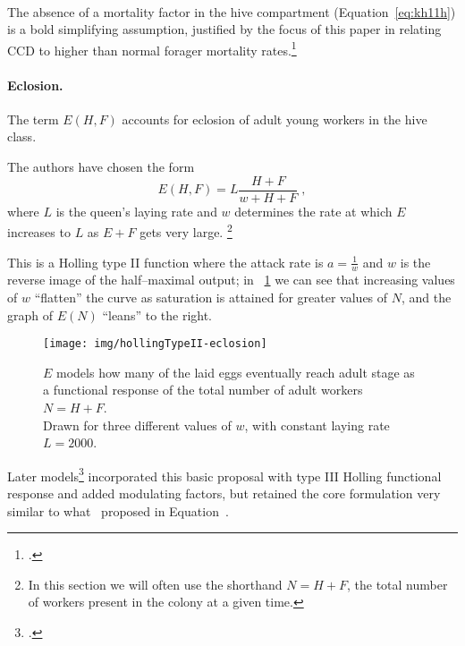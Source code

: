 \paragraph{}
The absence of a mortality factor in the hive compartment (Equation~\eqref{eq:kh11h}) is a bold simplifying assumption,
justified by the focus of this paper in relating CCD to higher than normal forager mortality rates.\footcite[1,2,3,5]{khoury2011}


\paragraph{Eclosion.}
The term $E(H,F)$ accounts for eclosion of adult young workers in the hive class.

The authors have chosen the form
\begin{equation}
    \label{eq:eclos}
    E(H,F) = L \frac{H+F}{w + H + F} \; ,
\end{equation}
where $L$ is the queen's laying rate and $w$ determines the rate at which $E$ increases to $L$ as $E+F$ gets very large.
\footnote{In this section we will often use the shorthand $N=H+F$, the total number of workers present in the colony at a given time.}

This is a Holling type II function where the attack rate is $a=\frac{1}{w}$ and $w$ is the reverse image of the half--maximal output; in \figurename~\ref{img:eclos} we can see that increasing values of $w$ ``flatten'' the curve
as saturation is attained for greater values of $N$, and the graph of $E(N)$ ``leans'' to the right.

\begin{figure}[pbh]
    \centering
    \texttt{[image: img/hollingTypeII-eclosion]}

    \caption[Holling type II Eclosion]{$E$ models how many of the laid eggs eventually reach adult stage as a functional response of the total number of adult workers $N=H+F$.
    \\
    Drawn for three different values of $w$, with constant laying rate $L=2000$.}
    \label{img:eclos}
\end{figure}

Later models\footcite{ratti2017} incorporated this basic proposal with type III Holling functional response and added modulating factors, but retained the core formulation very similar to what~\citeauthor{khoury2011} proposed in Equation~.


